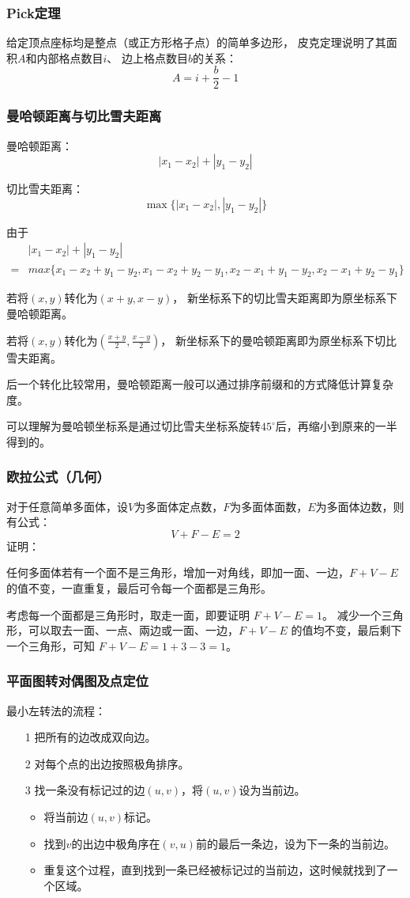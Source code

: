 \documentclass{ctexart}
\begin{document}
\subsubsection{Pick定理}
给定顶点座标均是整点（或正方形格子点）的简单多边形，
皮克定理说明了其面积$A$和内部格点数目$i$、
边上格点数目$b$的关系：
$$
A=i+\frac{b}{2}-1
$$
\subsubsection{曼哈顿距离与切比雪夫距离}
曼哈顿距离：
$$
|x_1-x_2|+|y_1-y_2|
$$

切比雪夫距离：
$$
\max\{|x_1-x_2|,|y_1-y_2|\}
$$

由于
$$
\begin{aligned}
    &|x_1-x_2|+|y_1-y_2| \\
     =& max\{x_1-x_2+y_1-y_2,x_1-x_2+y_2-y_1,x_2-x_1+y_1-y_2,x_2-x_1+y_2-y_1\}
\end{aligned}
$$

若将$(x, y)$转化为$(x+y,x-y)$，
新坐标系下的切比雪夫距离即为原坐标系下曼哈顿距离。 

若将$(x, y)$转化为$(\frac{x+y}{2},\frac{x-y}{2})$，
新坐标系下的曼哈顿距离即为原坐标系下切比雪夫距离。

后一个转化比较常用，曼哈顿距离一般可以通过排序前缀和的方式降低计算复杂度。

可以理解为曼哈顿坐标系是通过切比雪夫坐标系旋转$45^\circ$后，再缩小到原来的一半得到的。
\subsubsection{欧拉公式（几何）}
对于任意简单多面体，设$V$为多面体定点数，$F$为多面体面数，$E$为多面体边数，则有公式：
$$
V+F-E=2
$$
证明：

任何多面体若有一个面不是三角形，增加一对角线，即加一面、一边，$F + V - E$ 的值不变，一直重复，最后可令每一个面都是三角形。

考虑每一个面都是三角形时，取走一面，即要证明 $F + V - E = 1$。
减少一个三角形，可以取去一面、一点、兩边或一面、一边，$F + V - E$ 的值均不变，最后剩下一个三角形，可知 $F + V - E = 1 + 3 - 3 = 1$。
\subsubsection{平面图转对偶图及点定位}

最小左转法的流程：
\begin{itemize}
    \item[1] 把所有的边改成双向边。
    \item[2] 对每个点的出边按照极角排序。
    \item[3] 找一条没有标记过的边$(u,v)$，将$(u,v)$设为当前边。
    \begin{itemize}
        \item 将当前边$(u,v)$标记。
        \item 找到$v$的出边中极角序在$(v,u)$前的最后一条边，设为下一条的当前边。
        \item 重复这个过程，直到找到一条已经被标记过的当前边，这时候就找到了一个区域。
    \end{itemize}
\end{itemize}
\end{document}
